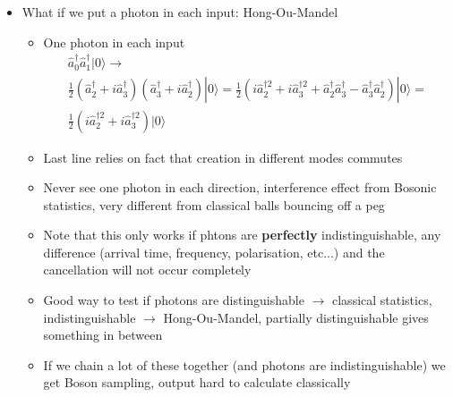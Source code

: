 \documentclass[english]{article}
\newcommand{\ket}[1]{|#1 \rangle}
\begin{document}
\begin{itemize}
\begin{itemize}
\begin{align}
 \frac{1}{\sqrt{2^n }}\sum_{k=0}^n (i^{n-k})\frac{n!}{k!(n-k)!} \sqrt{\frac{k!(n-k)!}{n!}}\ket{k}_2\ket{n-k}_3=\\
\sum_{k=0}^n (i^{n-k})\sqrt{  \frac{1}{2^n }\binom{n}{k}} \ket{k}_2\ket{n-k}_3
\end{align}
\item Normalized superpostion of all ways photons can be reflected, normalized state still has $n$ total photons always
\item Very entangled, state of one channel completely determined by state of the other
\end{itemize}
\item What if we put a photon in each input: Hong-Ou-Mandel
\begin{itemize}
\item One photon in each input
\begin{align}
\hat{a}^\dagger_0\hat{a}^\dagger_1\ket{0}\rightarrow\\
\frac{1}{2}(\hat{a}^{\dagger}_2+i\hat{a}^{\dagger}_3)(\hat{a}^{\dagger}_3+i\hat{a}^{\dagger}_2)\ket{0}=
\frac{1}{2}(i\hat{a}^{\dagger 2}_2+i\hat{a}^{\dagger 2}_3+\hat{a}^{\dagger}_2\hat{a}^{\dagger}_3-\hat{a}^{\dagger}_3\hat{a}^{\dagger}_2)\ket{0}=\\
\frac{1}{2}(i\hat{a}^{\dagger 2}_2+i\hat{a}^{\dagger 2}_3)\ket{0}
\end{align}
\item Last line relies on fact that creation in different modes commutes
\item Never see one photon in each direction, interference effect from Bosonic statistics, very different from classical balls bouncing off a peg
\item Note that this only works if phtons are \textbf{perfectly} indistinguishable, any difference (arrival time, frequency, polarisation, etc...) and the cancellation will not occur completely
\item Good way to test if photons are distinguishable $\rightarrow$ classical statistics, indistinguishable $\rightarrow$ Hong-Ou-Mandel, partially distinguishable gives something in between
\item If we chain a lot of these together (and photons are indistinguishable) we get Boson sampling, output hard to calculate classically
\end{itemize}
\end{itemize}
\end{document}
